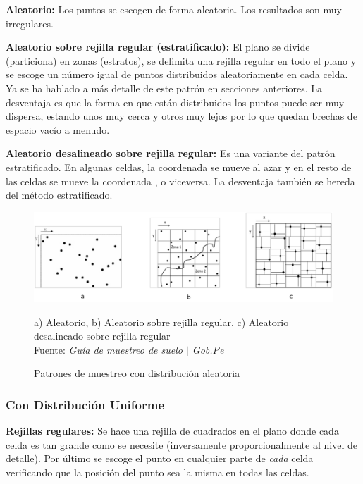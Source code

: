 \documentclass[conference]{IEEEtran}
\begin{document}
\textbf{Aleatorio:} Los puntos se escogen de forma aleatoria. Los resultados son muy irregulares.

\bigbreak

\textbf{Aleatorio sobre rejilla regular (estratificado):} El plano se divide (particiona) en zonas (estratos), se delimita una rejilla regular en todo el plano y se escoge un número igual de puntos distribuidos aleatoriamente en cada celda. Ya se ha hablado a más detalle de este patrón en secciones anteriores. La desventaja es que la forma en que están distribuidos los puntos puede ser muy dispersa, estando unos muy cerca y otros muy lejos por lo que quedan brechas de espacio vacío a menudo.

\bigbreak

\textbf{Aleatorio desalineado sobre rejilla regular:} Es una variante del patrón estratificado. En algunas celdas, la coordenada  se mueve al azar y en el resto de las celdas se mueve la coordenada , o viceversa. La desventaja también se hereda del método estratificado.

\begin{figure}[H]
    \centering
    \includegraphics[width=0.3\paperwidth]{ref/random-sampling-patterns.png}
    \caption{Patrones de muestreo con distribución aleatoria} \footnotesize
    a) Aleatorio, b) Aleatorio sobre rejilla regular, c) Aleatorio desalineado sobre rejilla regular \\
    Fuente: \textit{Guía de muestreo de suelo $\mid$ Gob.Pe} \cite{gobpe-ministerio-del-ambiente-2014}
\end{figure}

\subsubsection{Con Distribución Uniforme}

\textbf{Rejillas regulares:} Se hace una rejilla de cuadrados en el plano donde cada celda es tan grande como se necesite (inversamente proporcionalmente al nivel de detalle). Por último se escoge el punto en cualquier parte de \textit{cada} celda verificando que la posición del punto sea la misma en todas las celdas.
\end{document}
